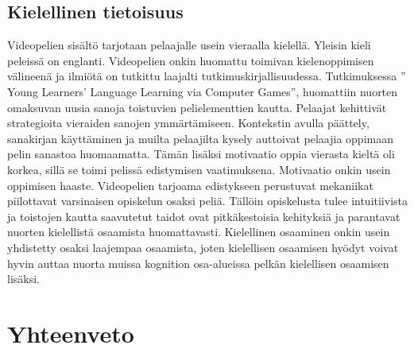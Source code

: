 \documentclass[utf8,bachelor]{gradu3}
\begin{document}
\section {Kielellinen tietoisuus}

Videopelien sisältö tarjotaan pelaajalle usein vieraalla kielellä. Yleisin kieli peleissä on englanti. Videopelien onkin huomattu toimivan kielenoppimisen välineenä ja ilmiötä on tutkittu laajalti tutkimuskirjallisuudessa. Tutkimuksessa '' Young Learners’ Language Learning via Computer Games'', huomattiin nuorten omaksuvan uusia sanoja toistuvien pelielementtien kautta. Pelaajat kehittivät strategioita vieraiden sanojen ymmärtämiseen. Kontekstin avulla päättely, sanakirjan käyttäminen ja muilta pelaajilta kysely auttoivat pelaajia oppimaan pelin sanastoa huomaamatta. Tämän lisäksi motivaatio oppia vierasta kieltä oli korkea, sillä se toimi pelissä edistymisen vaatimuksena. \parencite{turgut2009young} Motivaatio onkin usein oppimisen haaste. Videopelien tarjoama edistykseen perustuvat mekaniikat piilottavat varsinaisen opiskelun osaksi peliä. Tällöin opiskelusta tulee intuitiivista ja toistojen kautta saavutetut taidot ovat pitkäkestoisia kehityksiä ja parantavat nuorten kielellistä osaamista huomattavasti.  Kielellinen osaaminen onkin usein yhdistetty osaksi laajempaa osaamista, joten kielellisen osaamisen hyödyt voivat hyvin auttaa nuorta muissa kognition osa-alueissa pelkän kielellisen osaamisen lisäksi.  

\chapter{Yhteenveto}

\printbibliography
\end{document}
